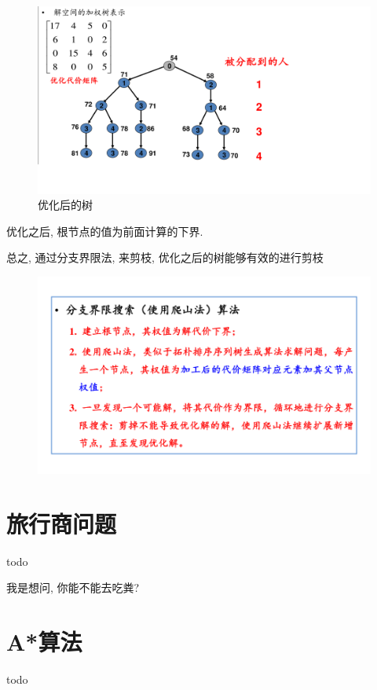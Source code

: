 \documentclass[a4paper, 10pt]{ctexbook} %
\begin{document}
\begin{figure}
    \centering
    \includegraphics[scale =0.5]{ss4.png}
    \caption{优化后的树}
\end{figure}

优化之后, 根节点的值为前面计算的下界. 

总之, 通过分支界限法, 来剪枝, 优化之后的树能够有效的进行剪枝
\begin{figure}
    \centering
    \includegraphics[scale = 0.5]{ss5.png}
\end{figure}
\chapter{旅行商问题}
todo

我是想问, 你能不能去吃粪?
\chapter{A*算法}
todo
\end{document}
